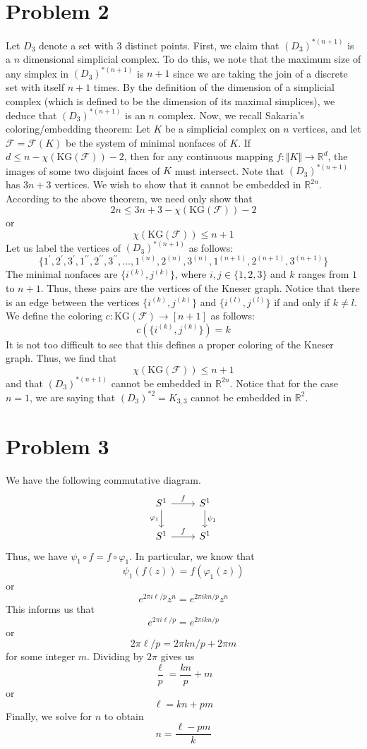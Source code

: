 \documentclass[12pt]{article}
\newcommand{\rr}{{\mathbb R}}
\begin{document}
\section*{Problem 2}
Let $D_3$ denote a set with $3$ distinct points. First, we claim that $(D_3)^{*(n+1)}$ is a $n$ dimensional simplicial complex. To do this, we note that the maximum size of any simplex in $(D_3)^{*(n+1)}$ is $n+1$ since we are taking the join of a discrete set with itself $n+1$ times. By the definition of the dimension of a simplicial complex (which is defined to be the dimension of its maximal simplices), we deduce that $(D_3)^{*(n+1)}$ is an $n$ complex. Now, we recall Sakaria's coloring/embedding theorem: Let $K$ be a simplicial complex on $n$ vertices, and let $\mathcal{F} = \mathcal{F}(K)$ be the system of minimal nonfaces of $K$. If $d \leq n - \chi(\text{KG}(\mathcal{F})) - 2$, then for any continuous mapping $f: \Vert K \Vert \rightarrow \rr^d$, the images of some two disjoint faces of $K$ must intersect. Note that $(D_3)^{*(n+1)}$ has $3n+3$ vertices. We wish to show that it cannot be embedded in $\rr^{2n}$. According to the above theorem, we need only show that
\[
2n \leq 3n + 3 - \chi(\text{KG}(\mathcal{F})) - 2
\] or
\[
\chi(\text{KG}(\mathcal{F})) \leq n + 1
\] Let us label the vertices of $(D_3)^{*(n+1)}$ as follows:
\[
\{1^\prime,2^\prime,3^\prime,1^{\prime\prime}, 2^{\prime\prime}, 3^{\prime\prime}, \ldots, 1^{(n)}, 2^{(n)}, 3^{(n)}, 1^{(n+1)}, 2^{(n+1)}, 3^{(n+1)}\}
\] The minimal nonfaces are $\{i^{(k)},j^{(k)}\}$, where $i,j \in \{1,2,3\}$ and $k$ ranges from $1$ to $n+1$. Thus, these pairs are the vertices of the Kneser graph. Notice that there is an edge between the vertices $\{i^{(k)},j^{(k)}\}$ and $\{i^{(l)},j^{(l)}\}$ if and only if $k \neq l$. We define the coloring $c: \text{KG}(\mathcal{F}) \rightarrow [n+1]$ as follows:
\[
c(\{i^{(k)},j^{(k)}\}) = k
\] It is not too difficult to see that this defines a proper coloring of the Kneser graph. Thus, we find that 
\[
\chi(\text{KG}(\mathcal{F})) \leq n + 1
\] and that $(D_3)^{*(n+1)}$ cannot be embedded in $\rr^{2n}$. Notice that for the case $n=1$, we are saying that $(D_3)^{*2} = K_{3,3}$ cannot be embedded in $\rr^2$.
\newpage
\section*{Problem 3}
We have the following commutative diagram.
\[
  \begin{tikzcd}
    S^1 \arrow{r}{f} \arrow[swap]{d}{\varphi_1} & S^1 \arrow{d}{\psi_1} \\
     S^1 \arrow{r}{f} & S^1
  \end{tikzcd}
\] Thus, we have $\psi_1 \circ f = f\circ \varphi_1$. In particular, we know that
\[
\psi_1(f(z)) = f(\varphi_1(z))
\] or
\[
e^{2\pi i \ell /p} z^n = e^{2 \pi i kn/p} z^n
\] This informs us that
\[
e^{2\pi i \ell /p} =  e^{2 \pi i kn/p}
\] or 
\[
2\pi\ell/p = 2 \pi kn/p + 2\pi m
\] for some integer $m$. Dividing by $2\pi$ gives us
\[
\frac{\ell}{p} = \frac{kn}{p} + m
\] or 
\[
\ell = kn + pm
\] Finally, we solve for $n$ to obtain
\[
n = \frac{\ell - pm}{k}
\]
\end{document}
